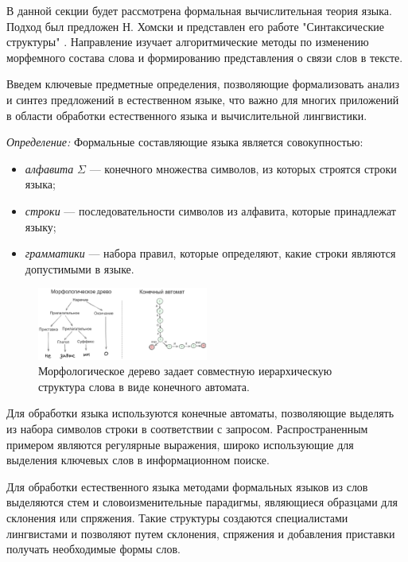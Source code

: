 В данной секции будет рассмотрена формальная вычислительная теория языка.
Подход был предложен Н. Хомски и представлен его работе "Синтаксические структуры" \cite{chomsky2002syntactic}. 
Направление изучает алгоритмические методы по изменению морфемного состава слова и формированию представления о связи слов в тексте.

Введем ключевые предметные определения, позволяющие формализовать анализ и синтез предложений в естественном языке, 
что важно для многих приложений в области обработки естественного языка и вычислительной лингвистики.
 
\textit{Определение:} Формальные составляющие языка является совокупностью:
\begin{itemize}
    \item \textit{алфавита} $\Sigma$ --- конечного множества символов, из которых строятся строки языка;
    \item \textit{строки} --- последовательности символов из алфавита, которые принадлежат языку;
    \item \textit{грамматики} --- набора правил, которые определяют, какие строки являются допустимыми в языке.
\end{itemize}

\begin{figure}[h]
    \centering
    \includegraphics[width=0.5\textwidth]{assets/ml/nlp/morph_tree.excalidraw.png}
    \caption{Морфологическое дерево задает совместную иерархическую структура слова в виде конечного автомата.}
    \label{morph}
\end{figure}

Для обработки языка используются конечные автоматы, позволяющие выделять из набора символов строки в соответствии с запросом. 
Распространенным примером являются регулярные выражения, широко использующие для выделения ключевых слов в информационном поиске.

Для обработки естественного языка методами формальных языков из слов выделяются стем и словоизменительные парадигмы, являющиеся 
образцами для склонения или спряжения. Такие структуры создаются специалистами лингвистами и позволяют путем склонения,
спряжения и добавления приставки получать необходимые формы слов.


